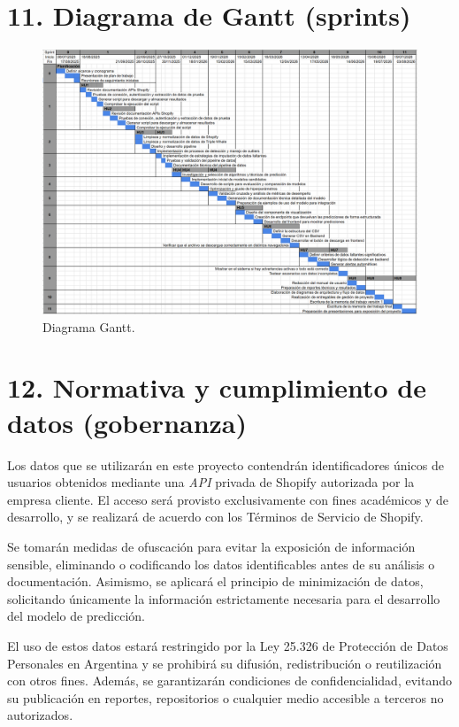 \documentclass[
11pt, %
]{charter}
\begin{document}
\section{11. Diagrama de Gantt (sprints)}
\label{sec:gantt}

\begin{figure}[htpb]
\centering 
\includegraphics[width=1\textwidth]{./Figuras/Gantt-2.png}
\caption{Diagrama Gantt.}

\end{figure}



\section{12. Normativa y cumplimiento de datos (gobernanza)}


Los datos que se utilizarán en este proyecto contendrán identificadores únicos de usuarios obtenidos mediante una \textit{API} privada de Shopify autorizada por la empresa cliente. El acceso será provisto exclusivamente con fines académicos y de desarrollo, y se realizará de acuerdo con los Términos de Servicio de Shopify.

Se tomarán medidas de ofuscación para evitar la exposición de información sensible, eliminando o codificando los datos identificables antes de su análisis o documentación. Asimismo, se aplicará el principio de minimización de datos, solicitando únicamente la información estrictamente necesaria para el desarrollo del modelo de predicción.

El uso de estos datos estará restringido por la Ley 25.326 de Protección de Datos Personales en Argentina y se prohibirá su difusión, redistribución o reutilización con otros fines. Además, se garantizarán condiciones de confidencialidad, evitando su publicación en reportes, repositorios o cualquier medio accesible a terceros no autorizados.
\end{document}
